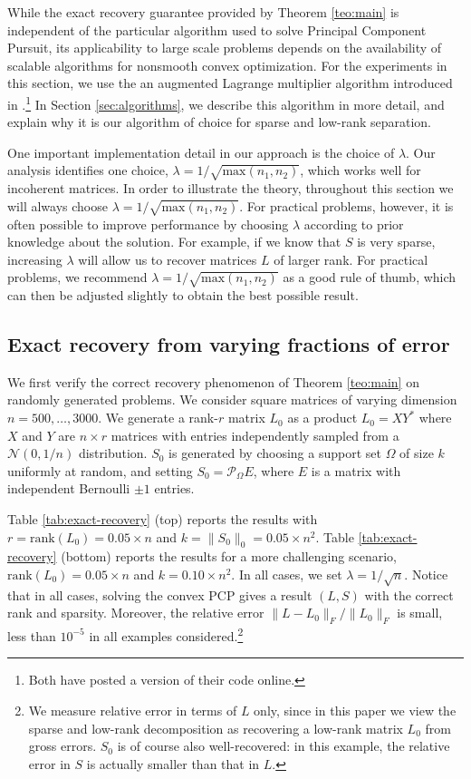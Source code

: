 While the exact recovery guarantee provided by Theorem \ref{teo:main}
is independent of the particular algorithm used to solve Principal Component Pursuit, its applicability to large scale problems depends on the availability of scalable algorithms for nonsmooth convex optimization. For the experiments in this section, we use the an augmented Lagrange multiplier algorithm introduced in
\cite{Lin2009-ALM,Yuan2009}.\footnote{Both \cite{Lin2009-ALM,Yuan2009} have posted a version of their code online.} In Section
\ref{sec:algorithms}, we describe this algorithm in more detail, and explain why it is our algorithm of choice for sparse and low-rank separation.

One important implementation detail in our approach is the choice of
$\lambda$. Our analysis identifies one choice, $\lambda =
1/\sqrt{\text{max}(n_1,n_2)}$, which works well for incoherent matrices. In order to illustrate the theory, throughout this section we will always choose $\lambda = 1/\sqrt{\text{max}(n_1,n_2)}$. For practical problems, however, it is often possible to improve performance by choosing $\lambda$ according to prior knowledge about the solution. For example, if we know that $S$ is very sparse, increasing $\lambda$ will allow us to recover matrices $L$ of larger rank. For practical problems, we recommend $\lambda =
1/\sqrt{\text{max}(n_1,n_2)}$ as a good rule of thumb, which can then be adjusted slightly to obtain the best possible result.

\subsection{Exact recovery from varying fractions of error}

We first verify the correct recovery phenomenon of Theorem \ref{teo:main} on randomly generated problems. We consider square matrices of varying dimension $n = 500, \ldots, 3000$. We generate a rank-$r$ matrix $L_0$ as a product $L_0 = X Y^*$ where $X$ and $Y$ are $n \times r$ matrices with entries independently sampled from a
$\mathcal{N}(0,1/n)$ distribution. $S_0$ is generated by choosing a support set $\Omega$ of size $k$ uniformly at random, and setting $S_0 = \mathcal{P}_{\Omega} E$, where $E$ is a matrix with independent Bernoulli $\pm 1$ entries.

Table \ref{tab:exact-recovery} (top) reports the results with $r =
\mathrm{rank}(L_0) = 0.05 \times n$ and $k = \| S_0 \|_0 = 0.05 \times
n^2$.  Table \ref{tab:exact-recovery} (bottom) reports the results for a more challenging scenario, $\mathrm{rank}(L_0) = 0.05 \times n$ and $k = 0.10 \times n^2$. In all cases, we set $\lambda =
1/\sqrt{n}$. Notice that in all cases, solving the convex PCP gives a result $(L, S)$ with the correct rank and sparsity. Moreover, the relative error $\| L - L_0 \|_F / \| L_0\|_F$ is small, less than $10^{-5}$ in all examples considered.\footnote{We measure relative error in terms of $L$ only, since in this paper we view the sparse and low-rank decomposition as recovering a low-rank matrix $L_0$ from gross errors. $S_0$ is of course also well-recovered: in this example, the relative error in $S$ is actually smaller than that in $L$.}

